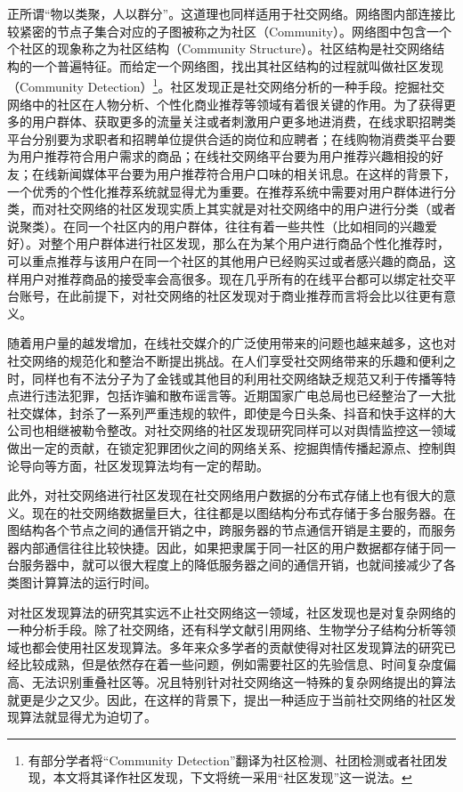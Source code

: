正所谓“物以类聚，人以群分”。这道理也同样适用于社交网络。网络图内部连接比较紧密的节点子集合对应的子图被称之为社区（Community）。网络图中包含一个个社区的现象称之为社区结构（Community Structure）。社区结构是社交网络结构的一个普遍特征。而给定一个网络图，找出其社区结构的过程就叫做社区发现（Community Detection）\footnote{有部分学者将“Community Detection”翻译为社区检测、社团检测或者社团发现，本文将其译作社区发现，下文将统一采用“社区发现”这一说法。}。社区发现正是社交网络分析的一种手段。挖掘社交网络中的社区在人物分析、个性化商业推荐等领域有着很关键的作用。为了获得更多的用户群体、获取更多的流量关注或者刺激用户更多地进消费，在线求职招聘类平台分别要为求职者和招聘单位提供合适的岗位和应聘者；在线购物消费类平台要为用户推荐符合用户需求的商品；在线社交网络平台要为用户推荐兴趣相投的好友；在线新闻媒体平台要为用户推荐符合用户口味的相关讯息。在这样的背景下，一个优秀的个性化推荐系统就显得尤为重要。在推荐系统中需要对用户群体进行分类，而对社交网络的社区发现实质上其实就是对社交网络中的用户进行分类（或者说聚类）。在同一个社区内的用户群体，往往有着一些共性（比如相同的兴趣爱好）。对整个用户群体进行社区发现，那么在为某个用户进行商品个性化推荐时，可以重点推荐与该用户在同一个社区的其他用户已经购买过或者感兴趣的商品，这样用户对推荐商品的接受率会高很多。现在几乎所有的在线平台都可以绑定社交平台账号，在此前提下，对社交网络的社区发现对于商业推荐而言将会比以往更有意义。

随着用户量的越发增加，在线社交媒介的广泛使用带来的问题也越来越多，这也对社交网络的规范化和整治不断提出挑战。在人们享受社交网络带来的乐趣和便利之时，同样也有不法分子为了金钱或其他目的利用社交网络缺乏规范又利于传播等特点进行违法犯罪，包括诈骗和散布谣言等。近期国家广电总局也已经整治了一大批社交媒体，封杀了一系列严重违规的软件，即使是今日头条、抖音和快手这样的大公司也相继被勒令整改。对社交网络的社区发现研究同样可以对舆情监控这一领域做出一定的贡献，在锁定犯罪团伙之间的网络关系、挖掘舆情传播起源点、控制舆论导向等方面，社区发现算法均有一定的帮助。

此外，对社交网络进行社区发现在社交网络用户数据的分布式存储上也有很大的意义。现在的社交网络数据量巨大，往往都是以图结构分布式存储于多台服务器。在图结构各个节点之间的通信开销之中，跨服务器的节点通信开销是主要的，而服务器内部通信往往比较快捷。因此，如果把隶属于同一社区的用户数据都存储于同一台服务器中，就可以很大程度上的降低服务器之间的通信开销，也就间接减少了各类图计算算法的运行时间。

对社区发现算法的研究其实远不止社交网络这一领域，社区发现也是对复杂网络的一种分析手段。除了社交网络，还有科学文献引用网络、生物学分子结构分析等领域也都会使用社区发现算法。多年来众多学者的贡献使得对社区发现算法的研究已经比较成熟，但是依然存在着一些问题，例如需要社区的先验信息、时间复杂度偏高、无法识别重叠社区等。况且特别针对社交网络这一特殊的复杂网络提出的算法就更是少之又少。因此，在这样的背景下，提出一种适应于当前社交网络的社区发现算法就显得尤为迫切了。

